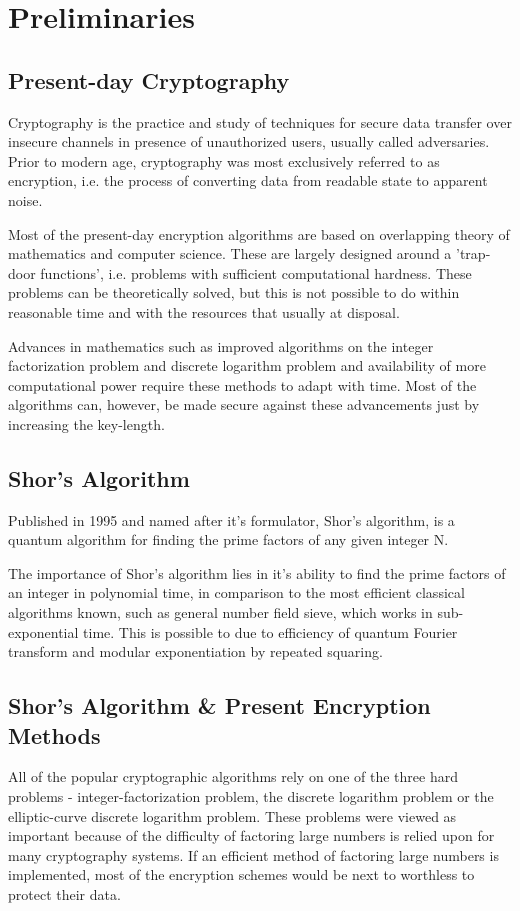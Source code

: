 \chapter{Preliminaries}
\label{chap:prelim}

\section{Present-day Cryptography}
Cryptography is the practice and study of techniques for secure data transfer over insecure channels in presence of unauthorized users, usually called adversaries. Prior to modern age, cryptography was most exclusively referred to as encryption, i.e. the process of converting data from readable state to apparent noise.

Most of the present-day encryption algorithms are based on overlapping theory of mathematics and computer science. These are largely designed around a 'trap-door functions', i.e. problems with sufficient computational hardness. These problems can be theoretically solved, but this is not possible to do within reasonable time and with the resources that usually at disposal.

Advances in mathematics such as improved algorithms on the integer factorization problem and discrete logarithm problem and availability of more computational power require these methods to adapt with time. Most of the algorithms can, however, be made secure against these advancements just by increasing the key-length.

\section{Shor's Algorithm}
Published in 1995 and named after it's formulator, Shor's algorithm, is a quantum algorithm for finding the prime factors of any given integer N.

The importance of Shor's algorithm lies in it's ability to find the prime factors of an integer in polynomial time, in comparison to the most efficient classical algorithms known, such as general number field sieve, which works in sub-exponential time. This is possible to due to efficiency of quantum Fourier transform and modular exponentiation by repeated squaring.

\section{Shor's Algorithm \& Present Encryption Methods}
All of the popular cryptographic algorithms rely on one of the three hard problems - integer-factorization problem, the discrete logarithm problem or the elliptic-curve discrete logarithm problem. These problems were viewed as important because of the difficulty of factoring large
numbers is relied upon for many cryptography systems. If an efficient method of factoring large numbers is implemented, most of the encryption schemes would be next to worthless to protect their data. 

